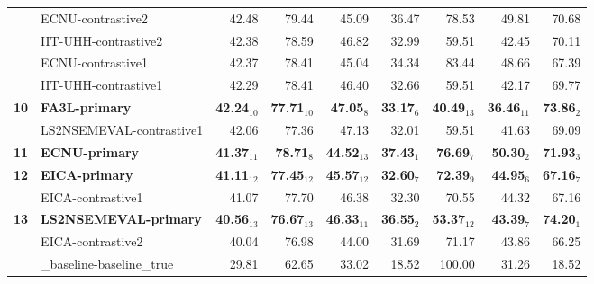 \begin{table*}[tbh]
\begin{center}
\begin{tabular}{clrrrrrrr}
& ECNU-contrastive2 & 42.48 & \scriptsize 79.44 & \scriptsize 45.09 & \scriptsize 36.47 & \scriptsize 78.53 & \scriptsize 49.81 & \scriptsize 70.68 \\
& IIT-UHH-contrastive2 & 42.38 & \scriptsize 78.59 & \scriptsize 46.82 & \scriptsize 32.99 & \scriptsize 59.51 & \scriptsize 42.45 & \scriptsize 70.11 \\
& ECNU-contrastive1 & 42.37 & \scriptsize 78.41 & \scriptsize 45.04 & \scriptsize 34.34 & \scriptsize 83.44 & \scriptsize 48.66 & \scriptsize 67.39 \\
& IIT-UHH-contrastive1 & 42.29 & \scriptsize 78.41 & \scriptsize 46.40 & \scriptsize 32.66 & \scriptsize 59.51 & \scriptsize 42.17 & \scriptsize 69.77 \\
\bf 10 & \bf FA3L-primary & \bf 42.24$_{10}$ & \bf \scriptsize 77.71$_{10}$ & \bf \scriptsize 47.05$_{8}$ & \bf \scriptsize 33.17$_{6}$ & \bf \scriptsize 40.49$_{13}$ & \bf \scriptsize 36.46$_{11}$ & \bf \scriptsize 73.86$_{2}$ \\
& LS2NSEMEVAL-contrastive1 & 42.06 & \scriptsize 77.36 & \scriptsize 47.13 & \scriptsize 32.01 & \scriptsize 59.51 & \scriptsize 41.63 & \scriptsize 69.09 \\
\bf 11 & \bf ECNU-primary & \bf 41.37$_{11}$ & \bf \scriptsize 78.71$_{8}$ & \bf \scriptsize 44.52$_{13}$ & \bf \scriptsize 37.43$_{1}$ & \bf \scriptsize 76.69$_{7}$ & \bf \scriptsize 50.30$_{2}$ & \bf \scriptsize 71.93$_{3}$ \\
\bf 12 & \bf EICA-primary & \bf 41.11$_{12}$ & \bf \scriptsize 77.45$_{12}$ & \bf \scriptsize 45.57$_{12}$ & \bf \scriptsize 32.60$_{7}$ & \bf \scriptsize 72.39$_{9}$ & \bf \scriptsize 44.95$_{6}$ & \bf \scriptsize 67.16$_{7}$ \\
& EICA-contrastive1 & 41.07 & \scriptsize 77.70 & \scriptsize 46.38 & \scriptsize 32.30 & \scriptsize 70.55 & \scriptsize 44.32 & \scriptsize 67.16 \\
\bf 13 & \bf LS2NSEMEVAL-primary & \bf 40.56$_{13}$ & \bf \scriptsize 76.67$_{13}$ & \bf \scriptsize 46.33$_{11}$ & \bf \scriptsize 36.55$_{2}$ & \bf \scriptsize 53.37$_{12}$ & \bf \scriptsize 43.39$_{7}$ & \bf \scriptsize 74.20$_{1}$ \\
& EICA-contrastive2 & 40.04 & \scriptsize 76.98 & \scriptsize 44.00 & \scriptsize 31.69 & \scriptsize 71.17 & \scriptsize 43.86 & \scriptsize 66.25 \\
& \_baseline-baseline\_true & 29.81 & \scriptsize 62.65 & \scriptsize 33.02 & \scriptsize 18.52 & \scriptsize 100.00 & \scriptsize 31.26 & \scriptsize 18.52 \\

\end{tabular}
\end{center}
\end{table*}
